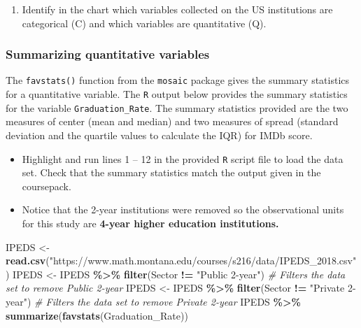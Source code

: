 \documentclass[
]{report}
\newenvironment{Shaded}{\begin{snugshade}}{\end{snugshade}}
\newcommand{\CommentTok}[1]{\textcolor[rgb]{0.56,0.35,0.01}{\textit{#1}}}
\newcommand{\FunctionTok}[1]{\textcolor[rgb]{0.13,0.29,0.53}{\textbf{#1}}}
\newcommand{\NormalTok}[1]{#1}
\newcommand{\OtherTok}[1]{\textcolor[rgb]{0.56,0.35,0.01}{#1}}
\newcommand{\SpecialCharTok}[1]{\textcolor[rgb]{0.81,0.36,0.00}{\textbf{#1}}}
\newcommand{\StringTok}[1]{\textcolor[rgb]{0.31,0.60,0.02}{#1}}
\providecommand{\tightlist}{%
  \setlength{\itemsep}{0pt}\setlength{\parskip}{0pt}}
\begin{document}
\begin{enumerate}
\def\labelenumi{\arabic{enumi}.}
\tightlist
\item
  Identify in the chart which variables collected on the US institutions are categorical (C) and which variables are quantitative (Q).
\end{enumerate}

\subsubsection*{Summarizing quantitative variables}\label{summarizing-quantitative-variables}

The \texttt{favstats()} function from the \texttt{mosaic} package gives the summary statistics for a quantitative variable. The \texttt{R} output below provides the summary statistics for the variable \texttt{Graduation\_Rate}. The summary statistics provided are the two measures of center (mean and median) and two measures of spread (standard deviation and the quartile values to calculate the IQR) for IMDb score.

\begin{itemize}
\item
  Highlight and run lines 1 -- 12 in the provided \texttt{R} script file to load the data set. Check that the summary statistics match the output given in the coursepack.
\item
  Notice that the 2-year institutions were removed so the observational units for this study are \textbf{4-year higher education institutions.}
\end{itemize}

\begin{Shaded}
\begin{Highlighting}[]
\NormalTok{IPEDS }\OtherTok{\textless{}{-}} \FunctionTok{read.csv}\NormalTok{(}\StringTok{"https://www.math.montana.edu/courses/s216/data/IPEDS\_2018.csv"}\NormalTok{) }
\NormalTok{IPEDS }\OtherTok{\textless{}{-}}\NormalTok{ IPEDS }\SpecialCharTok{\%\textgreater{}\%}
  \FunctionTok{filter}\NormalTok{(Sector }\SpecialCharTok{!=} \StringTok{"Public 2{-}year"}\NormalTok{) }\CommentTok{\# Filters the data set to remove Public 2{-}year}
\NormalTok{IPEDS }\OtherTok{\textless{}{-}}\NormalTok{ IPEDS }\SpecialCharTok{\%\textgreater{}\%}
  \FunctionTok{filter}\NormalTok{(Sector }\SpecialCharTok{!=} \StringTok{"Private 2{-}year"}\NormalTok{) }\CommentTok{\# Filters the data set to remove Private 2{-}year}
\NormalTok{IPEDS }\SpecialCharTok{\%\textgreater{}\%}
    \FunctionTok{summarize}\NormalTok{(}\FunctionTok{favstats}\NormalTok{(Graduation\_Rate))}
\end{Highlighting}
\end{Shaded}
\end{document}

